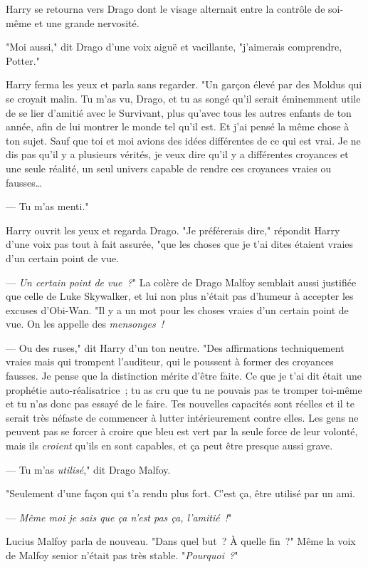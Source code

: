 Harry se retourna vers Drago dont le visage alternait entre la contrôle de soi-même et une grande nervosité.

"Moi aussi," dit Drago d'une voix aiguë et vacillante, "j'aimerais comprendre, Potter."

Harry ferma les yeux et parla sans regarder. "Un garçon élevé par des Moldus qui se croyait malin. Tu m'as vu, Drago, et tu as songé qu'il serait éminemment utile de se lier d'amitié avec le Survivant, plus qu'avec tous les autres enfants de ton année, afin de lui montrer le monde tel qu'il est. Et j'ai pensé la même chose à ton sujet. Sauf que toi et moi avions des idées différentes de ce qui est vrai. Je ne dis pas qu'il y a plusieurs vérités, je veux dire qu'il y a différentes croyances et une seule réalité, un seul univers capable de rendre ces croyances vraies ou fausses…

--- Tu m'as menti."

Harry ouvrit les yeux et regarda Drago. "Je préférerais dire," répondit Harry d'une voix pas tout à fait assurée, "que les choses que je t'ai dites étaient vraies d'un certain point de vue.

--- \emph{Un certain point de vue~?}" La colère de Drago Malfoy semblait aussi justifiée que celle de Luke Skywalker, et lui non plus n'était pas d'humeur à accepter les excuses d'Obi-Wan. "Il y a un mot pour les choses vraies d'un certain point de vue. On les appelle des \emph{mensonges~!}

--- Ou des ruses," dit Harry d'un ton neutre. "Des affirmations techniquement vraies mais qui trompent l'auditeur, qui le poussent à former des croyances fausses. Je pense que la distinction mérite d'être faite. Ce que je t'ai dit était une prophétie auto-réalisatrice~; tu as cru que tu ne pouvais pas te tromper toi-même et tu n'as donc pas essayé de le faire. Tes nouvelles capacités sont réelles et il te serait très néfaste de commencer à lutter intérieurement contre elles. Les gens ne peuvent pas se forcer à croire que bleu est vert par la seule force de leur volonté, mais ils \emph{croient} qu'ils en sont capables, et ça peut être presque aussi grave.

--- Tu m'as \emph{utilisé}," dit Drago Malfoy.

"Seulement d'une façon qui t'a rendu plus fort. C'est ça, être utilisé par un ami.

--- \emph{Même moi je sais que ça n'est pas ça, l'amitié~!}"

Lucius Malfoy parla de nouveau. "Dans quel but~? À quelle fin~?" Même la voix de Malfoy senior n'était pas très stable. "\emph{Pourquoi~?}"

